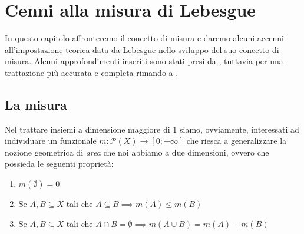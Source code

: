 \chapter{Cenni alla misura di Lebesgue}

In questo capitolo affronteremo il concetto di misura e daremo alcuni accenni all'impostazione teorica data da Lebesgue nello sviluppo
del suo concetto di misura. Alcuni approfondimenti inseriti sono stati presi da \cite{rudin}, tuttavia per una trattazione più accurata e completa rimando a \cite{ambrosio}.

\section{La misura}
Nel trattare insiemi a dimensione maggiore di $1$ siamo, ovviamente, interessati ad individuare un funzionale $m: \mathcal{P}(X) \to [0; +\infty]$ che riesca a generalizzare la nozione geometrica di \emph{area} che noi abbiamo a due dimensioni, ovvero che possieda le seguenti proprietà:
\begin{enumerate}[label=\protect\circled{\arabic*}]
	\item $m(\emptyset) = 0$
	\item Se $A, B \subseteq X$ tali che $A \subseteq B \implies m(A) \leq m(B)$
	\item Se $A, B \subseteq X$ tali che $A \cap B = \emptyset \implies m(A \cup B) = m(A) + m(B)$
\end{enumerate}